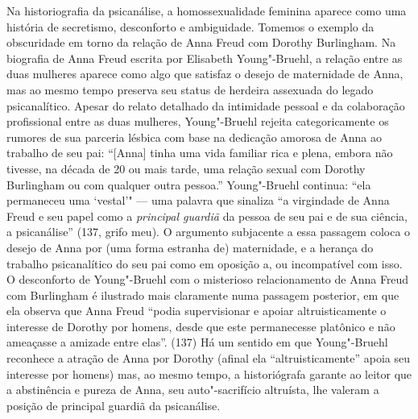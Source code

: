 Na historiografia da psicanálise, a homossexualidade feminina aparece
como uma história de secretismo, desconforto e ambiguidade. Tomemos o
exemplo da obscuridade em torno da relação de Anna Freud com Dorothy
Burlingham. Na biografia de Anna Freud escrita por Elisabeth
Young"-Bruehl, a relação entre as duas mulheres aparece como algo que
satisfaz o desejo de maternidade de Anna, mas ao mesmo tempo preserva
seu status de herdeira assexuada do legado psicanalítico. Apesar do
relato detalhado da intimidade pessoal e da colaboração profissional
entre as duas mulheres, Young"-Bruehl rejeita categoricamente os rumores
de sua parceria lésbica com base na dedicação amorosa de Anna ao
trabalho de seu pai: ``{[}Anna{]} tinha uma vida familiar rica e plena,
embora não tivesse, na década de 20 ou mais tarde, uma relação sexual
com Dorothy Burlingham ou com qualquer outra pessoa.'' Young"-Bruehl
continua: ``ela permaneceu uma `vestal'" --- uma palavra que sinaliza
``a virgindade de Anna Freud e seu papel como a \emph{principal guardiã}
da pessoa de seu pai e de sua ciência, a psicanálise'' (137, grifo meu).
O argumento subjacente a essa passagem coloca o desejo de Anna por (uma
forma estranha de) maternidade, e a herança do trabalho psicanalítico do
seu pai como em oposição a, ou incompatível com isso. O desconforto de
Young"-Bruehl com o misterioso relacionamento de Anna Freud com
Burlingham é ilustrado mais claramente numa passagem posterior, em que
ela observa que Anna Freud ``podia supervisionar e apoiar
altruisticamente o interesse de Dorothy por homens, desde que este
permanecesse platônico e não ameaçasse a amizade entre elas''. (137) Há
um sentido em que Young"-Bruehl reconhece a atração de Anna por Dorothy
(afinal ela ``altruisticamente'' apoia seu interesse por homens) mas, ao
mesmo tempo, a historiógrafa garante ao leitor que a abstinência e
pureza de Anna, seu auto"-sacrifício altruísta, lhe valeram a posição de
principal guardiã da psicanálise.

